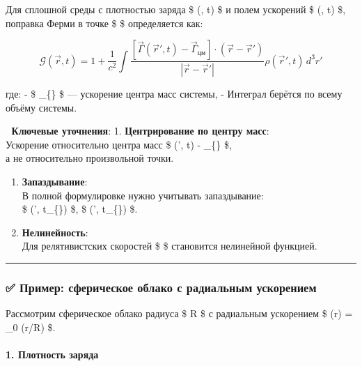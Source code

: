 \documentclass[11pt]{article}
\begin{document}
Для сплошной среды с плотностью заряда \$ \rho(, t) \$ и полем
ускорений \$ \vec{\Gamma}(, t) \$, поправка Ферми в точке \$
 \$ определяется как:

\[
\boxed{
\mathcal{G}(\vec{r}, t) = 1 + \frac{1}{c^2} \int \frac{[\vec{\Gamma}(\vec{r}', t) - \vec{\Gamma}_{\text{цм}}] \cdot (\vec{r} - \vec{r}')}{|\vec{r} - \vec{r}'|} \rho(\vec{r}', t) \, d^3r'
}
\]

где: - \$ \vec{\Gamma}\_\{\} \$ --- ускорение центра масс
системы, - Интеграл берётся по всему объёму системы.

📌 \textbf{Ключевые уточнения}: 1. \textbf{Центрирование по центру
масс}:\\
Ускорение относительно центра масс \$ \vec{\Gamma}(', t) -
\vec{\Gamma}\_\{\} \$,\\
а не относительно произвольной точки.

\begin{enumerate}
\def\labelenumi{\arabic{enumi}.}
\setcounter{enumi}{1}
\item
  \textbf{Запаздывание}:\\
  В полной формулировке нужно учитывать запаздывание:\\
  \$ \rho(', t\_\{\}) \$, \$ \vec{\Gamma}(',
  t\_\{\}) \$.
\item
  \textbf{Нелинейность}:\\
  Для релятивистских скоростей \$  \$ становится нелинейной
  функцией.
\end{enumerate}

\begin{center}\rule{0.5\linewidth}{\linethickness}\end{center}

\subsubsection{✅ Пример: сферическое облако с радиальным
ускорением}\label{ux43fux440ux438ux43cux435ux440-ux441ux444ux435ux440ux438ux447ux435ux441ux43aux43eux435-ux43eux431ux43bux430ux43aux43e-ux441-ux440ux430ux434ux438ux430ux43bux44cux43dux44bux43c-ux443ux441ux43aux43eux440ux435ux43dux438ux435ux43c}

Рассмотрим сферическое облако радиуса \$ R \$ с радиальным ускорением \$
\Gamma(r) = \Gamma\_0 (r/R) \$.

\paragraph{1. Плотность
заряда}\label{ux43fux43bux43eux442ux43dux43eux441ux442ux44c-ux437ux430ux440ux44fux434ux430}
\end{document}
